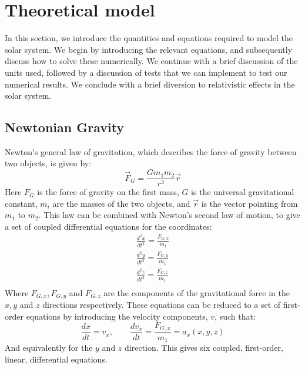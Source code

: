 \documentclass[a4paper, 10pt]{article}
\begin{document}
\section{Theoretical model}\label{Theoretical_section}
In this section, we introduce the quantities and equations required to model the solar system. We begin by introducing the relevant equations, and subsequently discuss how to solve these numerically. We continue with a brief discussion of the units used, followed by a discussion of tests that we can implement to test our numerical results. We conclude with a brief diversion to relativistic effects in the solar system.
\subsection{Newtonian Gravity}\label{Newtonian_Gravity}
Newton's general law of gravitation, which describes the force of gravity between two objects, is given by:
\begin{equation}
\vec{F}_{G}=\frac{Gm_1m_2}{r^3}\vec{r}
\end{equation}
Here $F_G$ is the force of gravity on the first mass, $G$ is the universal gravitational constant, $m_i$ are the masses of the two objects, and $\vec{r}$ is the vector pointing from $m_1$ to $m_2$. This law can be combined with Newton's second law of motion, to give a set of coupled differential equations for the coordinates:
\begin{equation}\label{eq:coupled_diff}
\begin{split}
\frac{d^2x}{dt^2}=\frac{F_{G,x}}{m_1}\\
\frac{d^2 y}{dt^2}=\frac{F_{G,y}}{m_1}\\
\frac{d^2 z}{dt^2}=\frac{F_{G,z}}{m_1}\\
\end{split}
\end{equation}
Where $F_{G,x}, F_{G,y}$ and $F_{G,z}$ are the components of the gravitational force in the $x, y$ and $z$ directions respectively. These equations can be reduced to a set of first-order equations by introducing the velocity components, $v$, such that:
\begin{equation}\label{eq:Velocity_position_equation}
\frac{dx}{dt}=v_x, \quad \quad \frac{dv_x}{dt}=\frac{F_{G,x}}{m_1}=a_x(x,y,z)
\end{equation}
And equivalently for the $y$ and $z$ direction. This gives six coupled, first-order, linear, differential equations.
\end{document}
